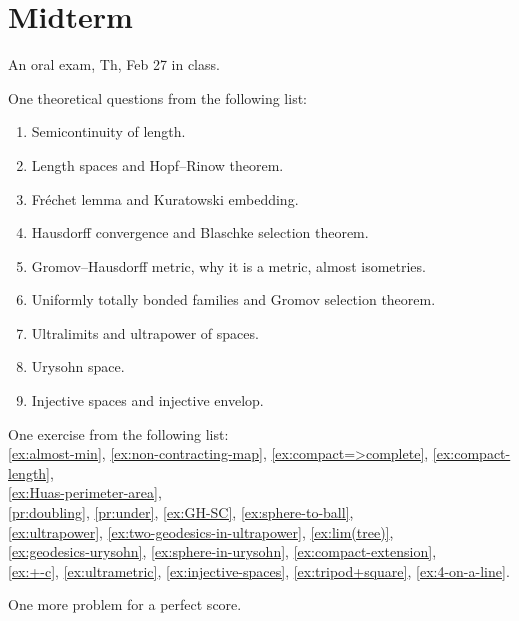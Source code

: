 \chapter{Midterm}\label{chap:midterm}

An oral exam, Th, Feb 27 in class.

\bigskip

\noi 
One theoretical questions from the following list:

\begin{enumerate}
\item 
Semicontinuity of length.
\item
Length spaces and Hopf--Rinow theorem.
\item
Fréchet lemma and Kuratowski embedding.
\item
Hausdorff convergence and Blaschke selection theorem.
\item
Gromov--Hausdorff metric, why it is a metric, almost isometries.
\item
Uniformly totally bonded families and Gromov selection theorem.
\item
Ultralimits and ultrapower of spaces.
\item
Urysohn space.
\item
Injective spaces and injective envelop.
\end{enumerate}

\bigskip

\noi One exercise from the following list:
\\
\ref{ex:almost-min},
\ref{ex:non-contracting-map},
\ref{ex:compact=>complete},
\ref{ex:compact-length},
\\
\ref{ex:Huas-perimeter-area},
\\
\ref{pr:doubling},
\ref{pr:under},
\ref{ex:GH-SC},
\ref{ex:sphere-to-ball},
\\
\ref{ex:ultrapower}, 
\ref{ex:two-geodesics-in-ultrapower},
\ref{ex:lim(tree)},
\\
\ref{ex:geodesics-urysohn},
\ref{ex:sphere-in-urysohn},
\ref{ex:compact-extension},
\\
\ref{ex:+-c},
\ref{ex:ultrametric},
\ref{ex:injective-spaces},
\ref{ex:tripod+square},
\ref{ex:4-on-a-line}.

\bigskip

\noi One more problem for a perfect score.
